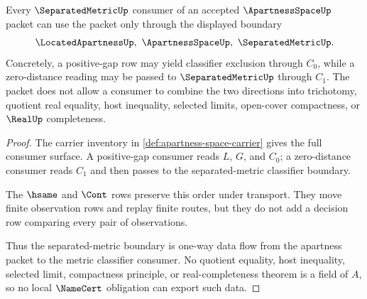 \begin{theorem}
\label{thm:apartness-space-separatedmetric-zero-distance-boundary}
Every $\SeparatedMetricUp$ consumer of an accepted $\ApartnessSpaceUp$ packet
can use the packet only through the displayed boundary
$$
\LocatedApartnessUp,\ \ApartnessSpaceUp,\ \SeparatedMetricUp .
$$
Concretely, a positive-gap row may yield classifier exclusion through $C_0$,
while a zero-distance reading may be passed to $\SeparatedMetricUp$ through
$C_1$. The packet does not allow a consumer to combine the two directions into
trichotomy, quotient real equality, host inequality, selected limits,
open-cover compactness, or $\RealUp$ completeness.
\end{theorem}
\begin{proof}
The carrier inventory in \autoref{def:apartness-space-carrier} gives the full
consumer surface. A positive-gap consumer reads $L$, $G$, and $C_0$; a
zero-distance consumer reads $C_1$ and then passes to the separated-metric
classifier boundary.

The $\hsame$ and $\Cont$ rows preserve this order under transport. They move
finite observation rows and replay finite routes, but they do not add a
decision row comparing every pair of observations.

Thus the separated-metric boundary is one-way data flow from the apartness
packet to the metric classifier consumer. No quotient equality, host
inequality, selected limit, compactness principle, or real-completeness theorem
is a field of $A$, so no local $\NameCert$ obligation can export such data.
\end{proof}

